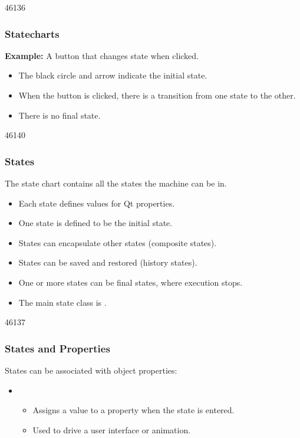 \begin{slide}{46136}\frametitle{Statecharts}
\textbf{Example:} A button that changes state when clicked.

\vspace*{1.5em}
\vspace*{1.5em}

\begin{itemize}
\item The black circle and arrow indicate the initial state.
\item When the button is clicked, there is a transition from one state to
the other.
\item There is no final state.
\end{itemize}
\end{slide}

\begin{slide}{46140}\frametitle{States}
\label{Animation-States-States}
\vspace*{1.0em}
The state chart contains all the states the machine can be in.

\begin{itemize}
\item Each state defines values for Qt properties.
\item One state is defined to be the initial state.
\item States can encapsulate other states (composite states).
\item States can be saved and restored (history states).
\item One or more states can be final states, where execution stops.
\item The main state class is .
\end{itemize}
\end{slide}

\begin{slide}[fragile]{46137}\frametitle{States and Properties}
\label{Animation-States-Properties}
\vspace*{1.0em}
States can be associated with object properties:

\vspace*{1.5em}
\vspace*{1.0em}

\begin{itemize}
\item {}
\begin{itemize}
\item Assigns a value to a property when the state is entered.
\item Used to drive a user interface or animation.
\end{itemize}
\end{itemize}
\end{slide}

